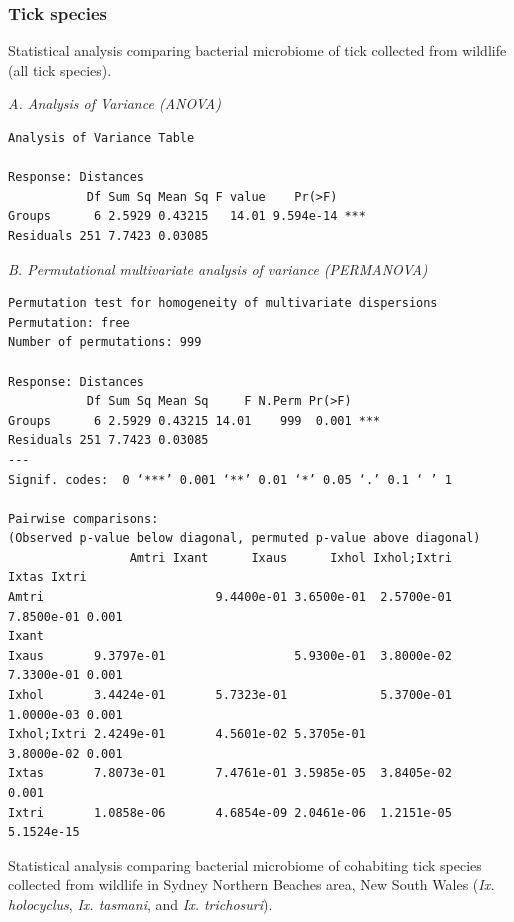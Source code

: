 \documentclass[a4paper, nobind]{templates/ociamthesis}
\begin{document}
\newpage

\hypertarget{ch3stats2}{%
\subsubsection{Tick species}\label{ch3stats2}}

Statistical analysis comparing bacterial microbiome of tick collected from wildlife (all tick species).

\emph{A. Analysis of Variance (ANOVA)}

\begin{verbatim}
Analysis of Variance Table

Response: Distances
           Df Sum Sq Mean Sq F value    Pr(>F)    
Groups      6 2.5929 0.43215   14.01 9.594e-14 ***
Residuals 251 7.7423 0.03085         
\end{verbatim}

\emph{B. Permutational multivariate analysis of variance (PERMANOVA)}

\begin{verbatim}
Permutation test for homogeneity of multivariate dispersions
Permutation: free
Number of permutations: 999

Response: Distances
           Df Sum Sq Mean Sq     F N.Perm Pr(>F)    
Groups      6 2.5929 0.43215 14.01    999  0.001 ***
Residuals 251 7.7423 0.03085                        
---
Signif. codes:  0 ‘***’ 0.001 ‘**’ 0.01 ‘*’ 0.05 ‘.’ 0.1 ‘ ’ 1

Pairwise comparisons:
(Observed p-value below diagonal, permuted p-value above diagonal)
                 Amtri Ixant      Ixaus      Ixhol Ixhol;Ixtri      Ixtas Ixtri
Amtri                        9.4400e-01 3.6500e-01  2.5700e-01 7.8500e-01 0.001
Ixant                                                                          
Ixaus       9.3797e-01                  5.9300e-01  3.8000e-02 7.3300e-01 0.001
Ixhol       3.4424e-01       5.7323e-01             5.3700e-01 1.0000e-03 0.001
Ixhol;Ixtri 2.4249e-01       4.5601e-02 5.3705e-01             3.8000e-02 0.001
Ixtas       7.8073e-01       7.4761e-01 3.5985e-05  3.8405e-02            0.001
Ixtri       1.0858e-06       4.6854e-09 2.0461e-06  1.2151e-05 5.1524e-15   
\end{verbatim}

\newpage

Statistical analysis comparing bacterial microbiome of cohabiting tick species collected from wildlife in Sydney Northern Beaches area, New South Wales (\emph{Ix. holocyclus}, \emph{Ix. tasmani}, and \emph{Ix. trichosuri}).
\end{document}
